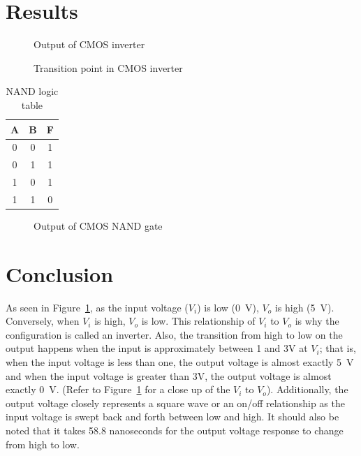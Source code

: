 \newpage

\section{Results}
\label{sec:results}

\begin{figure}[hbtp]
  \centering
  \resizebox{1.0\textwidth}{!}{}
  \caption{\label{fig:inverter} Output of CMOS inverter}
\end{figure}

\begin{figure}[hbtp]
  \centering
  \resizebox{1.0\textwidth}{!}{}
  \caption{\label{fig:data2} Transition point in CMOS inverter}
\end{figure}


\begin{table}[hbtp]
  \centering
  \begin{tabular}{cc|c}
    A & B & F \\
    \hline
    0 & 0 & 1 \\
    0 & 1 & 1 \\
    1 & 0 & 1 \\
    1 & 1 & 0 \\
  \end{tabular}
  \caption{\label{tab:nand} NAND logic table}
  \end{table}

\begin{figure}[hbtp]
  \centering
  \resizebox{1.0\textwidth}{!}{}
  \caption{\label{fig:nand} Output of CMOS NAND gate}
\end{figure}

\newpage

\section{Conclusion}
\label{sec:conclusion}

As seen in Figure~\ref{fig:inverter}, as the input voltage ($V_i$) is low (\SI{0}{V}), $V_o$ is high (\SI{5}{V}). Conversely, when $V_i$ is high, $V_o$ is low. This relationship of $V_i$ to $V_o$ is why the configuration is called an inverter.  Also, the transition from high to low on the output happens when the input is approximately between 1 and 3V at $V_i$; that is, when the input voltage is less than one, the output voltage is almost exactly \SI{5}{V} and when the input voltage is greater than 3V, the output voltage is almost exactly \SI{0}{V}.  (Refer to Figure~\ref{fig:inverter} for a close up of the $V_i$ to $V_o$).  Additionally, the output voltage closely represents a square wave or an on/off relationship as the input voltage is swept back and forth between low and high. It should also be noted that it takes 58.8 nanoseconds for the output voltage response to change from high to low.

